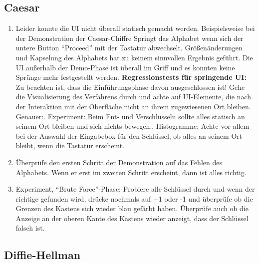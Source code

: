 \documentclass{article}
\begin{document}
 \subsection{Caesar}
  \begin{enumerate}
   \item Leider konnte die UI nicht überall statisch gemacht werden. Beispielsweise bei der Demonstration der Caesar-Chiffre 
         Springt das Alphabet wenn sich der untere Button ``Proceed'' mit der Tastatur abwechselt. Größenänderungen und Kapselung des 
         Alphabets hat zu keinem sinnvollen Ergebnis geführt. Die UI außerhalb der Demo-Phase ist überall im Griff und es konnten 
         keine Sprünge mehr festgestellt werden.\newline 
         \textbf{Regressionstests für springende UI:}\newline
         Zu beachten ist, dass die Einführungsphase davon ausgeschlossen ist!\newline
         Gehe die Visualisierung des Verfahrens durch und achte auf UI-Elemente, die nach der Interaktion mit der Oberfläche 
         nicht an ihrem zugewiesenen Ort bleiben. Genauer:. Experiment: Beim Ent- und Verschlüsseln sollte alles statisch an seinem Ort bleiben und sich nichts bewegen.. Histogramme: Achte vor allem bei der Auswahl der Eingabebox für den Schlüssel, ob alles an seinem Ort bleibt, wenn die
            Tastatur erscheint.
   \item Überprüfe den ersten Schritt der Demonstration auf das Fehlen des Alphabets. Wenn er erst im zweiten Schritt erscheint, dann ist
         alles richtig.
   \item Experiment, ``Brute Force''-Phase: Probiere alle Schlüssel durch und wenn der richtige gefunden wird, drücke nochmals auf +1 oder -1
         und überprüfe ob die Grenzen des Kastens sich wieder blau gefärbt haben. Überprüfe auch ob die Anzeige an der oberen Kante
         des Kastens wieder anzeigt, dass der Schlüssel falsch ist.     
  \end{enumerate}
  
  \subsection{Diffie-Hellman}
\end{document}
